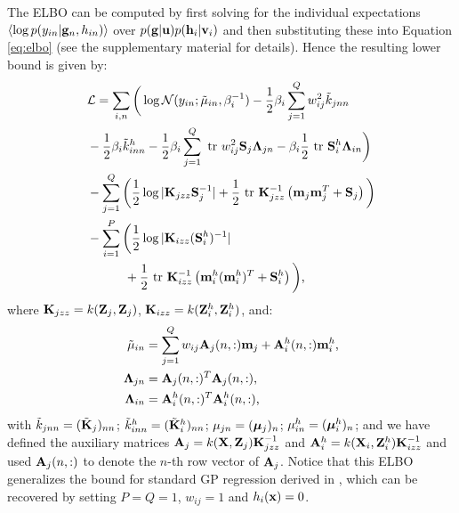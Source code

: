 The ELBO can be computed by first solving for the individual expectations 
$ \left\langle \log p(y_{in} | \mathbf{g}_n, h_{in})  \right\rangle$ over ${p(\mathbf{g} | \mathbf{u}) p(\mathbf{h}_i | \mathbf{v}_i)}$ and 
then substituting these into Equation \eqref{eq:elbo} (see the supplementary material for details). 
Hence the resulting lower bound is given by:
\begin{align}
\nonumber
 & \mathcal{L} = 
\sum_{i,n}
\bigg( \log  \mathcal{N}(y_{in}; \tilde{\mu}_{in}, \beta_i^{-1})
          - \frac{1}{2} \beta_i \sum_{j=1}^Q w_{ij}^2 \tilde{k}_{jnn} \\ \nonumber
         &- \frac{1}{2} \beta_i \tilde{k}^h_{inn}
         - \frac{1}{2} \beta_i \sum_{j=1}^Q \mbox{ \rm tr } w_{ij}^2 \mathbf{S}_j \mathbf{\Lambda}_{jn} - \beta_i \frac{1}{2} \mbox{ \rm tr } \mathbf{S}^h_i \mathbf{\Lambda}_{in} 
\bigg) \\
\nonumber
& - \sum_{j=1}^Q \bigg( \frac{1}{2} \log |\mathbf{K}_{jzz} \mathbf{S}_j^{-1}| + \frac{1}{2} \mbox{ \rm tr } \mathbf{K}_{jzz}^{-1}  \left( \mathbf{m}_j \mathbf{m}_j^T + \mathbf{S}_j \right)\bigg) \\
\nonumber
& - \sum_{i=1}^P  \bigg( \frac{1}{2} \log |\mathbf{K}_{izz}(\mathbf{S}^h_i)^{-1}| \\
& \quad \qquad + \frac{1}{2} \mbox{ \rm tr } \mathbf{K}_{izz}^{-1} \left( \mathbf{m}^h_i (\mathbf{m}^h_i)^T   +   \mathbf{S}^h_i \right) \bigg)  \text{,}
  \label{eq:L}
\end{align}
%
where $\mathbf{K}_{jzz} = k(\mathbf{Z}_j, \mathbf{Z}_j)$, $\mathbf{K}_{izz} = k(\mathbf{Z}^h_i, \mathbf{Z}^h_i)$, and:
\begin{align}
\tilde{\mu}_{in}
&= \sum_{j=1}^Q w_{ij} \mathbf{A}_j(n,:) \mathbf{m}_j + \mathbf{A}^h_i(n,:) \mathbf{m}^h_i \text{,}\\
\mathbf{\Lambda}_{jn}
&= \mathbf{A}_j(n,:)^T \mathbf{A}_j(n,:)  \text{,}\\
\mathbf{\Lambda}_{in}
&= \mathbf{A}^h_i(n,:)^T \mathbf{A}^h_i(n,:)  \text{,}
\end{align}
with $\tilde{k}_{jnn} = (\tilde{\mathbf{K}}_j)_{nn}$; 
$\tilde{k}^h_{inn} = (\tilde{\mathbf{K}}^h_i)_{nn}$; 
$\mu_{jn} = (\boldsymbol{\mu}_j)_n$;
 $\mu^h_{in} = (\boldsymbol{\mu}^h_i)_n$; 
and we have defined the auxiliary matrices $\mathbf{A}_j = k(\mathbf{X},\mathbf{Z}_j) \mathbf{K}_{jzz}^{-1}$ and $\mathbf{A}^h_i = k(\mathbf{X}_i,\mathbf{Z}^h_i)\mathbf{K}_{izz}^{-1}$ and 
used $\mathbf{A}_j(n,:)$ to denote the $n$-th row vector of $\mathbf{A}_j$. 
Notice that this ELBO  generalizes the bound for standard GP regression derived in \cite{hensmangaussian}, which can be recovered by setting $P = Q = 1$, $w_{ij} = 1$ and $h_i(\mathbf{x}) = 0$.

